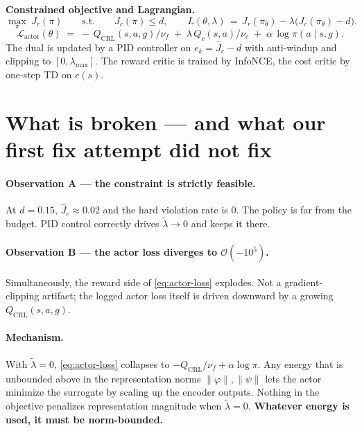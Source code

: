 \documentclass[11pt]{article}
\newcommand{\Jr}{J_{r}}
\newcommand{\Jc}{J_{c}}
\newcommand{\Jhatc}{\widehat{J}_{c}}
\newcommand{\Qc}{Q_{c}}
\newcommand{\QCRL}{Q_{\mathrm{CRL}}}
\newcommand{\lamt}{\tilde{\lambda}}
\newcommand{\Ltext}[1]{\mathcal{L}_{\text{#1}}}
\begin{document}
\noindent\textbf{Constrained objective and Lagrangian.}
\begin{equation}
\max_{\pi}\ \Jr(\pi)\qquad \text{s.t.}\qquad \Jc(\pi)\le d,
\qquad
L(\theta,\lambda)\,=\,\Jr(\pi_\theta)-\lambda\bigl(\Jc(\pi_\theta)-d\bigr).
\label{eq:cmdp}
\end{equation}
\begin{equation}
\Ltext{actor}(\theta)
\;=\;-\,\QCRL(s,a,g)/\nu_f\;+\;\lambda\,\Qc(s,a)/\nu_c\;+\;\alpha\,\log\pi(a\mid s,g).
\label{eq:actor-loss}
\end{equation}
The dual is updated by a PID controller on $e_k=\Jhatc-d$ with anti-windup
and clipping to $[0,\lambda_{\max}]$. The reward critic is trained by
InfoNCE, the cost critic by one-step TD on $c(s)$.

\section{What is broken --- and what our first fix attempt did not fix}
\label{sec:issues}

\paragraph{Observation A --- the constraint is strictly feasible.}
At $d=0.15$, $\Jhatc\approx 0.02$ and the hard violation rate is $0$. The
policy is far from the budget. PID control correctly drives $\lamt\to 0$
and keeps it there.

\paragraph{Observation B --- the actor loss diverges to $\mathcal{O}(-10^{5})$.}
Simultaneously, the reward side of \eqref{eq:actor-loss} explodes. Not a
gradient-clipping artifact; the logged actor loss itself is driven downward
by a growing $\QCRL(s,a,g)$.

\paragraph{Mechanism.}
With $\lamt=0$, \eqref{eq:actor-loss} collapses to
$-\QCRL/\nu_f + \alpha\log\pi$. Any energy that is unbounded above in the
representation norms $\|\varphi\|,\|\psi\|$ lets the actor minimize the
surrogate by scaling up the encoder outputs. Nothing in the objective
penalizes representation magnitude when $\lamt=0$. \textbf{Whatever energy
is used, it must be norm-bounded.}
\end{document}
